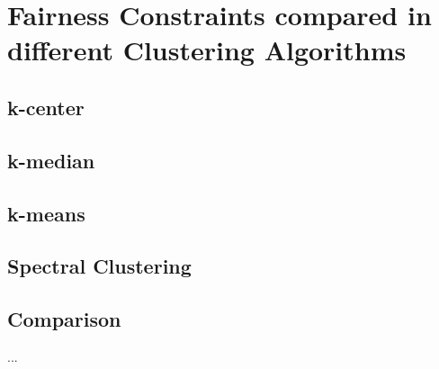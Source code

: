 \section{Fairness Constraints compared in different Clustering Algorithms}

\subsection{k-center}
\textcite[]{Chierichetti2018}

\subsection{k-median}
\textcite[]{Chierichetti2018}

\subsection{k-means}
\textcite[]{Schmidt2018}
\textcite[]{Likas2003}

\subsection{Spectral Clustering}
\textcite[]{Kawale2013}

\subsection{Comparison}
...
